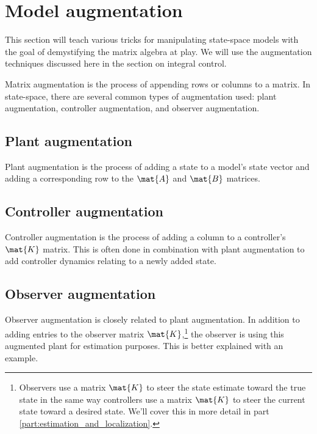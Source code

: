 \section{Model augmentation}

This section will teach various tricks for manipulating state-space
\glspl{model} with the goal of demystifying the matrix algebra at play. We will
use the augmentation techniques discussed here in the section on integral
control.

Matrix augmentation is the process of appending rows or columns to a matrix. In
state-space, there are several common types of augmentation used: \gls{plant}
augmentation, controller augmentation, and \gls{observer} augmentation.

\subsection{Plant augmentation}

Plant augmentation is the process of adding a state to a model's state vector
and adding a corresponding row to the $\mat{A}$ and $\mat{B}$ matrices.

\subsection{Controller augmentation}

Controller augmentation is the process of adding a column to a controller's
$\mat{K}$ matrix. This is often done in combination with \gls{plant}
augmentation to add controller dynamics relating to a newly added \gls{state}.

\subsection{Observer augmentation}

Observer augmentation is closely related to \gls{plant} augmentation. In
addition to adding entries to the \gls{observer} matrix
$\mat{K}$,\footnote{Observers use a matrix $\mat{K}$ to steer the state estimate
toward the true state in the same way controllers use a matrix $\mat{K}$ to
steer the current state toward a desired state. We'll cover this in more detail
in part \ref{part:estimation_and_localization}.} the \gls{observer} is using
this augmented \gls{plant} for estimation purposes. This is better explained
with an example.

